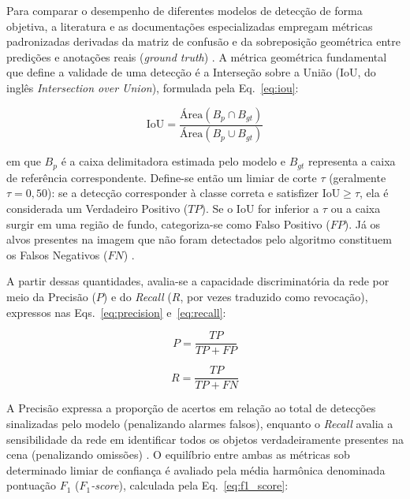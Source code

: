 Para comparar o desempenho de diferentes modelos de detecção de forma objetiva, a literatura e as documentações especializadas empregam métricas padronizadas derivadas da matriz de confusão e da sobreposição geométrica entre predições e anotações reais (\textit{ground truth}) \cite{padilla2021, ultralytics_metrics}. A métrica geométrica fundamental que define a validade de uma detecção é a Interseção sobre a União (IoU, do inglês \textit{Intersection over Union}), formulada pela Eq.~\ref{eq:iou}:

\begin{equation}
\text{IoU} = \frac{\text{Área}(B_p \cap B_{gt})}{\text{Área}(B_p \cup B_{gt})}
\label{eq:iou}
\end{equation}

\noindent em que $B_p$ é a caixa delimitadora estimada pelo modelo e $B_{gt}$ representa a caixa de referência correspondente. Define-se então um limiar de corte $\tau$ (geralmente $\tau = 0{,}50$): se a detecção corresponder à classe correta e satisfizer $\text{IoU} \ge \tau$, ela é considerada um Verdadeiro Positivo ($TP$). Se o IoU for inferior a $\tau$ ou a caixa surgir em uma região de fundo, categoriza-se como Falso Positivo ($FP$). Já os alvos presentes na imagem que não foram detectados pelo algoritmo constituem os Falsos Negativos ($FN$) \cite{padilla2021}.

A partir dessas quantidades, avalia-se a capacidade discriminatória da rede por meio da Precisão ($P$) e do \textit{Recall} ($R$, por vezes traduzido como revocação), expressos nas Eqs.~\ref{eq:precision} e~\ref{eq:recall}:

\begin{equation}
P = \frac{TP}{TP + FP}
\label{eq:precision}
\end{equation}

\begin{equation}
R = \frac{TP}{TP + FN}
\label{eq:recall}
\end{equation}

\noindent A Precisão expressa a proporção de acertos em relação ao total de detecções sinalizadas pelo modelo (penalizando alarmes falsos), enquanto o \textit{Recall} avalia a sensibilidade da rede em identificar todos os objetos verdadeiramente presentes na cena (penalizando omissões) \cite{padilla2021}. O equilíbrio entre ambas as métricas sob determinado limiar de confiança é avaliado pela média harmônica denominada pontuação $F_1$ ($F_1$\textit{-score}), calculada pela Eq.~\ref{eq:f1_score}:

